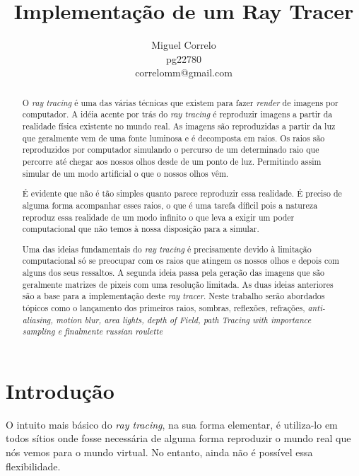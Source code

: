 \documentclass[12pt]{article}
\title{Implementação de um Ray Tracer}
\author{Miguel Correlo \\
\small{pg22780}\\
\small{correlomm@gmail.com}}
\begin{document}
\maketitle

\begin{abstract}
O {\it ray tracing} é uma das várias técnicas que existem para fazer {\it render} de imagens por computador. A idéia acente por trás do {\it ray tracing} é reproduzir imagens a partir da realidade física existente no mundo real. As imagens são reproduzidas a partir da luz que geralmente vem de uma fonte luminosa e é decomposta em raios. Os raios são reproduzidos por computador simulando o percurso de um determinado raio que percorre até chegar aos nossos olhos desde de um ponto de luz. Permitindo assim simular de um modo artificial o que o nossos olhos vêm.\newline

É evidente que não é tão simples quanto parece reproduzir essa realidade. É preciso de alguma forma acompanhar esses raios, o que é uma tarefa díficil pois a natureza reproduz essa realidade de um modo infinito o que leva a exigir um poder computacional que não temos à nossa disposição para a simular.\newline

Uma das ideias fundamentais do {\it ray tracing} é precisamente devido à limitação computacional só se preocupar com os raios que atingem os nossos olhos e depois com alguns dos seus ressaltos. A segunda ideia passa pela geração das imagens que são geralmente matrizes de pixeis com uma resolução limitada. As duas ideias anteriores são a base para a implementação deste {\it ray tracer}. Neste trabalho serão abordados tópicos como o lançamento dos primeiros raios, sombras, reflexões, refrações, {\it anti-aliasing, motion blur, area lights, depth of Field, path Tracing with importance sampling e finalmente russian roulette}


\end{abstract}

\section{Introdução}
\vspace{5 mm}
\hspace{8 mm} O intuito mais básico do {\it ray tracing}, na sua forma elementar, é utiliza-lo em todos sítios onde fosse necessária de alguma forma reproduzir o mundo real que nós vemos para o mundo virtual. No entanto, ainda não é possível essa flexibilidade.\newline
\end{document}
